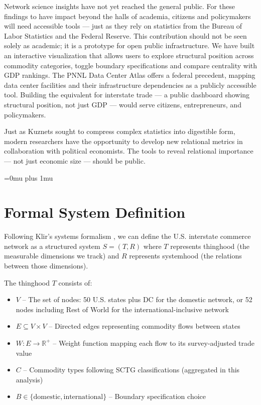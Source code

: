\documentclass[12pt,oneside]{book}
\begin{document}
Network science insights have not yet reached the general public. For these findings to have impact beyond the halls of academia, citizens and policymakers will need accessible tools --- just as they rely on statistics from the Bureau of Labor Statistics and the Federal Reserve. This contribution should not be seen solely as academic; it is a prototype for open public infrastructure. We have built an interactive visualization that allows users to explore structural position across commodity categories, toggle boundary specifications and compare centrality with GDP rankings. The PNNL Data Center Atlas \cite{noauthor_im3pnnlgovdatacenter-atlas_nodate} offers a federal precedent, mapping data center facilities and their infrastructure dependencies as a publicly accessible tool. Building the equivalent for interstate trade --- a public dashboard showing structural position, not just GDP --- would serve citizens, entrepreneurs, and policymakers. 

Just as Kuznets sought to compress complex statistics into digestible form, modern researchers have the opportunity to develop new relational metrics in collaboration with political economists. The tools to reveal relational importance --- not just economic size --- should be public.



\Urlmuskip=0mu plus 1mu




\FloatBarrier
\appendix

\chapter{Formal System Definition}
\label{appendix:formal_system}

Following Klir's systems formalism \cite{klir_facets_2001}, we can define the U.S. interstate commerce network as a structured system $S = (T,
R)$ where $T$ represents thinghood (the measurable dimensions we track) and $R$ represents systemhood (the relations between those dimensions).

The thinghood $T$ consists of:
\begin{itemize}
  \item $V$ -- The set of nodes: 50 U.S. states plus DC for the domestic network, or 52 nodes including Rest of World for the international-inclusive network
  \item $E \subseteq V \times V$ -- Directed edges representing commodity flows between states
  \item $W: E \to \mathbb{R}^+$ -- Weight function mapping each flow to its survey-adjusted trade value
  \item $C$ -- Commodity types following SCTG classifications (aggregated in this analysis)
  \item $B \in \{\text{domestic}, \text{international}\}$ -- Boundary specification choice
\end{itemize}
\end{document}
